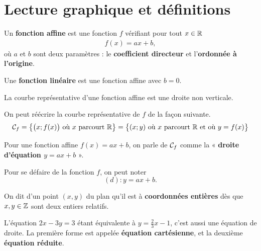 \documentclass[a4paper, 12pt]{report}
\begin{document}
\section{Lecture graphique et définitions}\label{sec:aff-1}

\begin{defn}
	Un \textbf{fonction affine} est une fonction $f$ vérifiant pour tout $x\in\mathbb{R}$
		\begin{align}
			f(x) = ax + b, \label{eq:affine}
		\end{align}
	où $a$ et $b$ sont deux paramètres : le \textbf{coefficient directeur} et l'\textbf{ordonnée à l'origine}.
\end{defn}

\begin{nomen}
	Une \textbf{fonction linéaire} est une fonction affine avec $b=0$.
\end{nomen}

\begin{prop}
	La courbe représentative d'une fonction affine est une droite non verticale.
\end{prop}

\begin{rmq}
	On peut réécrire la courbe représentative de $f$ de la façon suivante.
		\[ \mathcal{C}_f = \bigl\{  \bigl(x ; f(x) \bigr) \text{ où $x$ parcourt $\mathbb{R}$}  \bigr\}
		= \bigl\{  (x ; y ) \text{ où $x$ parcourt $\mathbb{R}$ et où $y = f(x)$}  \bigr\} \]
\end{rmq}

\begin{defn}
	Pour une fonction affine $f(x) = ax+b$, on parle de $\mathcal{C}_f$ comme la « \textbf{droite d'équation $y=ax+b$} ».
\end{defn}


\begin{nota}
	Pour se défaire de la fonction $f$, on peut noter
		\[ (d) : y = ax+b. \]
\end{nota}

\begin{nomen}
	On dit d'un point $(x, y)$ du plan qu'il est à \textbf{coordonnées entières} dès que $x, y \in \mathbb{Z}$ sont deux entiers relatifs.
\end{nomen}

\begin{rmq}
	L'équation $2x  - 3y= 3$ étant équivalente à $y = \frac23 x - 1$, c'est aussi une équation de droite.
	La première forme est appelée \textbf{équation cartésienne}, et la deuxième \textbf{équation réduite}.
\end{rmq}
\end{document}
